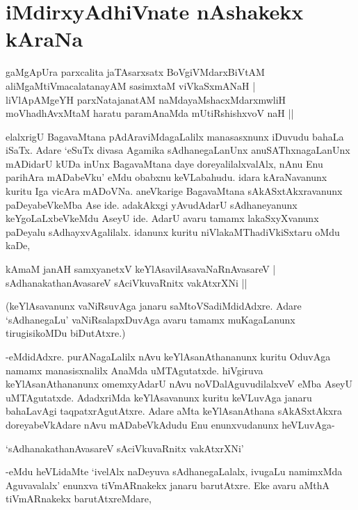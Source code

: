 \chapter{iMdirxyAdhiVnate nAshakekx kAraNa}\label{chap10}

\begin{shloka}
gaMgApUra parxcalita jaTAsarxsatx BoVgiVMdarxBiVtAM\\
aliMgaMtiVmacalatanayAM sasimxtaM viVkaSxmANaH |\\
liVlApAMgeYH parxNatajanatAM naMdayaMshacxMdarxmwliH\\
moVhadhAvxMtaM haratu paramAnaMda mUtiRshishxvoV naH ||
\end{shloka}
elalxrigU BagavaMtana pAdAraviMdagaLalilx manasasxnunx iDuvudu bahaLa iSaTx. Adare `eSuTx divasa Agamika sAdhanegaLanUnx anuSAThxnagaLanUnx mADidarU kUDa inUnx BagavaMtana daye doreyalilalxvalAlx, nAnu Enu parihAra mADabeVku' eMdu obabxnu keVLabahudu. idara kAraNavanunx kuritu Iga vicAra mADoVNa. aneVkarige BagavaMtana sAkASxtAkxravanunx paDeyabeVkeMba Ase ide. adakAkxgi yAvudAdarU sAdhaneyanunx keYgoLaLxbeVkeMdu AseyU ide. AdarU avaru tamamx lakaSxyXvanunx paDeyalu sAdhayxvAgalilalx. idanunx kuritu niVlakaMThadiVkiSxtaru oMdu kaDe,

\begin{shloka}
kAmaM janAH samxyanetxV keYlAsavilAsavaNaRnAvasareV |\\
sAdhanakathanAvasareV sAciVkuvaRnitx vakAtxrXNi ||
\end{shloka}

(keYlAsavanunx vaNiRsuvAga janaru saMtoVSadiMdidAdxre. Adare `sAdhanegaLu' vaNiRsalapxDuvAga avaru tamamx muKagaLanunx tirugisikoMDu biDutAtxre.)

-eMdidAdxre. purANagaLalilx nAvu keYlAsanAthananunx kuritu OduvAga namamx manasisxnalilx AnaMda uMTAgutatxde. hiVgiruva keYlAsanAthananunx omemxyAdarU nAvu noVDalAguvudilalxveV eMba AseyU uMTAgutatxde. AdadxriMda keYlAsavanunx kuritu keVLuvAga janaru bahaLavAgi taqpatxrAgutAtxre. Adare aMta keYlAsanAthana sAkASxtAkxra doreyabeVkAdare nAvu mADabeVkAdudu Enu enunxvudanunx heVLuvAga-

\begin{shloka}
`sAdhanakathanAvasareV sAciVkuvaRnitx vakAtxrXNi'
\end{shloka}

-eMdu heVLidaMte `ivelAlx naDeyuva sAdhanegaLalalx, ivugaLu namimxMda Aguvavalalx' enunxva tiVmARnakekx janaru barutAtxre. Eke avaru aMthA tiVmARnakekx barutAtxreMdare,

